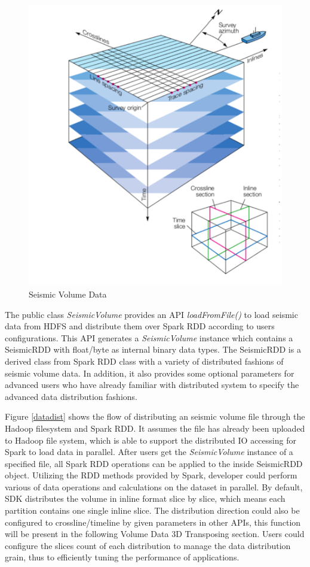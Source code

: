 \begin{figure}[h]
\centering
\includegraphics[scale=0.6]{figures/seisdata.png}
\caption{Seismic Volume Data \cite{seisinline}}
\label{seisdata}
\end{figure}

The public class \emph{SeismicVolume} provides an API \emph{loadFromFile()} to load seismic data from HDFS and distribute them over Spark RDD according to users configurations. This API generates a \emph{SeismicVolume} instance which contains a SeismicRDD with float/byte as internal binary data types. The SeismicRDD is a derived class from Spark RDD class with a variety of distributed fashions of seismic volume data. In addition, it also provides some optional parameters for advanced users who have already familiar with distributed system to specify the advanced data distribution fashions. 

Figure \ref{datadist} shows the flow of distributing an seismic volume file through the Hadoop filesystem and Spark RDD. It assumes the file has already been uploaded to Hadoop file system, which is able to support the distributed IO accessing for Spark to load data in parallel. After users get the  \emph{SeismicVolume} instance of a specified file,  all Spark RDD operations can be applied to the inside SeismicRDD object. Utilizing the RDD methods provided by Spark, developer could perform various of data operations and calculations on the dataset in parallel. By default, SDK distributes the volume in inline format slice by slice, which means each partition contains one single inline slice. The distribution direction could also be configured to crossline/timeline by given parameters in other APIs, this function will be present in the following Volume Data 3D Transposing section. Users could configure the slices count of each distribution to manage the data distribution grain, thus to efficiently tuning the performance of applications.

